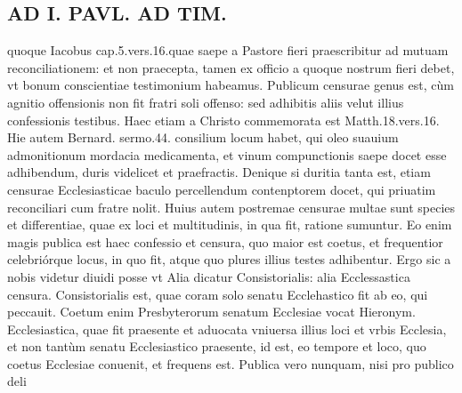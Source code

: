 \documentclass{article}
\begin{document}
\begin{pages}
\section*{AD I. PAVL. AD TIM. }
\marginpar{[ p.320 ]}\pstart quoque Iacobus cap.5.vers.16.quae saepe a Pastore fieri praescribitur ad mutuam reconciliationem: et non praecepta, tamen ex officio a quoque nostrum fieri debet, vt bonum conscientiae testimonium habeamus.  \pend\pstart Publicum censurae genus est, cùm agnitio offensionis non fit fratri soli offenso: sed adhibitis aliis velut illius confessionis testibus. Haec etiam a Christo commemorata est Matth.18.vers.16. Hie autem Bernard. sermo.44. consilium locum habet, qui oleo suauium admonitionum mordacia medicamenta, et vinum compunctionis saepe docet esse adhibendum, duris videlicet et praefractis. Denique si duritia tanta est, etiam censurae Ecclesiasticae baculo percellendum contenptorem docet, qui priuatim reconciliari cum fratre nolit. Huius autem postremae censurae multae sunt species et differentiae, quae ex loci et multitudinis, in qua fit, ratione sumuntur. Eo enim magis publica est haec confessio et censura, quo maior est coetus, et frequentior celebriórque locus, in quo fit, atque quo plures illius testes adhibentur. Ergo sic a nobis videtur diuidi posse vt Alia dicatur Consistorialis: alia Ecclessastica censura. Consistorialis est, quae coram solo senatu Ecclehastico fit ab eo, qui peccauit. Coetum enim Presbyterorum senatum Ecclesiae vocat Hieronym. Ecclesiastica, quae fit praesente et aduocata vniuersa illius loci et vrbis Ecclesia, et non tantùm senatu Ecclesiastico praesente, id est, eo tempore et loco, quo coetus Ecclesiae conuenit, et frequens est.  \pend\pstart Publica vero nunquam, nisi pro publico deli\pend

\end{pages}
\end{document}
